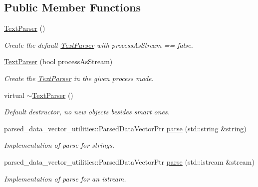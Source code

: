 \subsection*{Public Member Functions}
\begin{DoxyCompactItemize}
\item 
\hyperlink{classtudat_1_1input__output_1_1TextParser_a8a2fccf83edc89ea7983523527b439d6}{Text\+Parser} ()
\begin{DoxyCompactList}\small\item\em Create the default \hyperlink{classtudat_1_1input__output_1_1TextParser}{Text\+Parser} with process\+As\+Stream == false. \end{DoxyCompactList}\item 
\hyperlink{classtudat_1_1input__output_1_1TextParser_a68d2338a4ec8741beecae9ea4559ba49}{Text\+Parser} (bool process\+As\+Stream)
\begin{DoxyCompactList}\small\item\em Create the \hyperlink{classtudat_1_1input__output_1_1TextParser}{Text\+Parser} in the given process mode. \end{DoxyCompactList}\item 
virtual \hyperlink{classtudat_1_1input__output_1_1TextParser_aa9b9ccb909a665d5252efee839738712}{$\sim$\+Text\+Parser} ()\hypertarget{classtudat_1_1input__output_1_1TextParser_aa9b9ccb909a665d5252efee839738712}{}\label{classtudat_1_1input__output_1_1TextParser_aa9b9ccb909a665d5252efee839738712}

\begin{DoxyCompactList}\small\item\em Default destructor, no new objects besides smart ones. \end{DoxyCompactList}\item 
parsed\+\_\+data\+\_\+vector\+\_\+utilities\+::\+Parsed\+Data\+Vector\+Ptr \hyperlink{classtudat_1_1input__output_1_1TextParser_a3644442307eb67b0f2422ae3a88db7d5}{parse} (std\+::string \&string)
\begin{DoxyCompactList}\small\item\em Implementation of parse for strings. \end{DoxyCompactList}\item 
parsed\+\_\+data\+\_\+vector\+\_\+utilities\+::\+Parsed\+Data\+Vector\+Ptr \hyperlink{classtudat_1_1input__output_1_1TextParser_aed0200deca3a30deb07165f60c5b6229}{parse} (std\+::istream \&stream)
\begin{DoxyCompactList}\small\item\em Implementation of parse for an istream. \end{DoxyCompactList}\end{DoxyCompactItemize}

